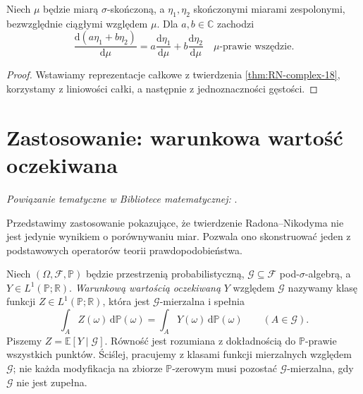 \begin{wniosek}
\label{cor:RN-linearity-18}
Niech $\mu$ będzie miarą $\sigma$-skończoną,
a $\eta_1,\eta_2$ skończonymi miarami zespolonymi,
bezwzględnie ciągłymi względem $\mu$.
Dla $a,b\in\mathbb C$ zachodzi
\[
\frac{\mathrm d(a\eta_1+b\eta_2)}{\mathrm d\mu}
=a\frac{\mathrm d\eta_1}{\mathrm d\mu}
+b\frac{\mathrm d\eta_2}{\mathrm d\mu}
\quad\mu\text{-prawie wszędzie}.
\]
\end{wniosek}
\begin{proof}
Wstawiamy reprezentacje całkowe z twierdzenia
\ref{thm:RN-complex-18}, korzystamy z liniowości całki,
a następnie z jednoznaczności gęstości.
\end{proof}

\section{Zastosowanie: warunkowa wartość oczekiwana}

\noindent\emph{Powiązanie tematyczne w Bibliotece matematycznej:} .

Przedstawimy zastosowanie pokazujące, że twierdzenie
Radona--Nikodyma nie jest jedynie wynikiem o porównywaniu
miar. Pozwala ono skonstruować jeden z podstawowych
operatorów teorii prawdopodobieństwa.

\begin{definicja}
\label{def:conditional-exp-18}
Niech $(\Omega,\mathcal F,\mathbb P)$ będzie przestrzenią
probabilistyczną, $\mathcal G\subseteq\mathcal F$
pod-$\sigma$-algebrą, a $Y\in L^1(\mathbb P;\mathbb R)$.
\emph{Warunkową wartością oczekiwaną} $Y$ względem
$\mathcal G$ nazywamy klasę funkcji
$Z\in L^1(\mathbb P;\mathbb R)$, która jest
$\mathcal G$-mierzalna i spełnia
\begin{equation}\label{eq:CE-def-18}
\int_A Z(\omega)\,\mathrm d\mathbb P(\omega)
=\int_A Y(\omega)\,\mathrm d\mathbb P(\omega)
\qquad(A\in\mathcal G).
\end{equation}
Piszemy $Z=\mathbb E[Y\mid\mathcal G]$.
Równość jest rozumiana z dokładnością do
$\mathbb P$-prawie wszystkich punktów. Ściślej, pracujemy
z klasami funkcji mierzalnych względem $\mathcal G$;
nie każda modyfikacja na zbiorze $\mathbb P$-zerowym musi
pozostać $\mathcal G$-mierzalna, gdy $\mathcal G$ nie jest zupełna.
\end{definicja}


